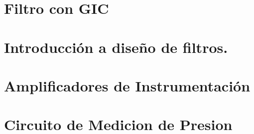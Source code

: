 







\tableofcontents
\newpage


\section{Filtro con GIC}
	
	\newpage

\section{Introducción a diseño de filtros.}
	
	\newpage
	
\section{Amplificadores de Instrumentación}
	\label{seccion:3}
	
	\newpage

\section{Circuito de Medicion de Presion}
	
	\newpage
	
	
	\newpage
	
	\newpage
	
